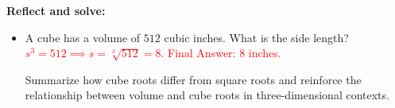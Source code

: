 \documentclass[12pt]{article}
\begin{document}
\begin{tcolorbox}[colframe=black!60, colback=white, 
coltitle=black, colbacktitle=black!15, fonttitle=\bfseries\Large, 
title=Exit Ticket, halign title=center, left=10pt, right=10pt, top=10pt, bottom=15pt]
\textbf{Reflect and solve:}

\begin{itemize}
    \item A cube has a volume of \(512\) cubic inches. What is the side length?  
    \textcolor{red}{\(s^3 = 512 \implies s = \sqrt[3]{512} = 8.\) Final Answer: \(8\) inches.}
    
    {\color{blue} Summarize how cube roots differ from square roots and reinforce the relationship between volume and cube roots in three-dimensional contexts.}
\end{itemize}
\end{tcolorbox}
\end{document}
